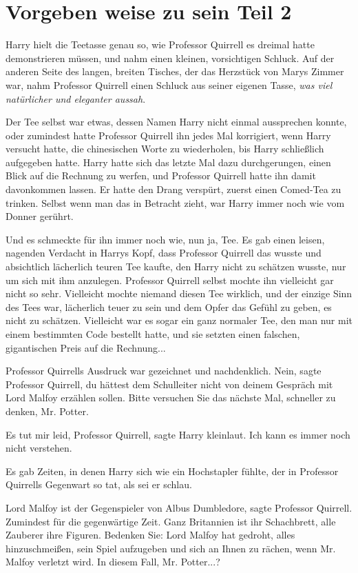 \chapter{Vorgeben weise zu sein Teil 2}

Harry hielt die Teetasse genau so, wie Professor Quirrell es dreimal hatte
demonstrieren müssen, und nahm einen kleinen, vorsichtigen Schluck. Auf der
anderen Seite des langen, breiten Tisches, der das Herzstück von Marys Zimmer
war, nahm Professor Quirrell einen Schluck aus seiner eigenen Tasse, \emph{was
viel natürlicher und eleganter aussah}.

Der Tee selbst war etwas, dessen Namen Harry nicht einmal aussprechen konnte,
oder zumindest hatte Professor Quirrell ihn jedes Mal korrigiert, wenn Harry
versucht hatte, die chinesischen Worte zu wiederholen, bis Harry schließlich
aufgegeben hatte. Harry hatte sich das letzte Mal dazu durchgerungen, einen
Blick auf die Rechnung zu werfen, und Professor Quirrell hatte ihn damit
davonkommen lassen. Er hatte den Drang verspürt, zuerst einen Comed-Tea zu
trinken. Selbst wenn man das in Betracht zieht, war Harry immer noch wie vom
Donner gerührt.

Und es schmeckte für ihn immer noch wie, nun ja, Tee. Es gab einen leisen,
nagenden Verdacht in Harrys Kopf, dass Professor Quirrell das wusste und
absichtlich lächerlich teuren Tee kaufte, den Harry nicht zu schätzen wusste,
nur um sich mit ihm anzulegen. Professor Quirrell selbst mochte ihn vielleicht
gar nicht so sehr. Vielleicht mochte niemand diesen Tee wirklich, und der
einzige Sinn des Tees war, lächerlich teuer zu sein und dem Opfer das Gefühl zu
geben, es nicht zu schätzen. Vielleicht war es sogar ein ganz normaler Tee, den
man nur mit einem bestimmten Code bestellt hatte, und sie setzten einen
falschen, gigantischen Preis auf die Rechnung...

Professor Quirrells Ausdruck war gezeichnet und nachdenklich. \glqq{}Nein\grqq{},
sagte Professor Quirrell, \glqq{}du hättest dem Schulleiter nicht von deinem
Gespräch mit Lord Malfoy erzählen sollen. Bitte versuchen Sie das nächste Mal,
schneller zu denken, Mr. Potter.\grqq{}

\glqq{}Es tut mir leid, Professor Quirrell\grqq{}, sagte Harry kleinlaut. \glqq{}
Ich kann es immer noch nicht verstehen.\grqq{}

Es gab Zeiten, in denen Harry sich wie ein Hochstapler fühlte, der in Professor
Quirrells Gegenwart so tat, als sei er schlau.

\glqq{}Lord Malfoy ist der Gegenspieler von Albus Dumbledore\grqq{}, sagte
Professor Quirrell. \glqq{}Zumindest für die gegenwärtige Zeit. Ganz Britannien
ist ihr Schachbrett, alle Zauberer ihre Figuren. Bedenken Sie: Lord Malfoy hat
gedroht, alles hinzuschmeißen, sein Spiel aufzugeben und sich an Ihnen zu
rächen, wenn Mr. Malfoy verletzt wird. In diesem Fall, Mr. Potter...?\grqq{}

